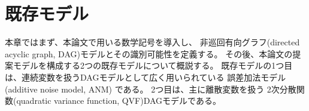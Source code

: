
\section{既存モデル}
\label{part:model}

本章ではまず、本論文で用いる数学記号を導入し、
非巡回有向グラフ(directed acyclic graph, DAG)モデルとその識別可能性を定義する。
その後、本論文の提案モデルを構成する2つの既存モデルについて概説する。
既存モデルの1つ目は、連続変数を扱うDAGモデルとして広く用いられている
誤差加法モデル(additive noise model, ANM)
\cite{Shimizu2006-yu}
\cite{Hoyer2008-oo}
\cite{Peters2013-eb}
\cite{Peters2014-ro}
\cite{Park2020-ey}
である。
2つ目は、主に離散変数を扱う
2次分散関数(quadratic variance function, QVF)DAGモデル\cite{Park2017-hw}である。



%

%

%

